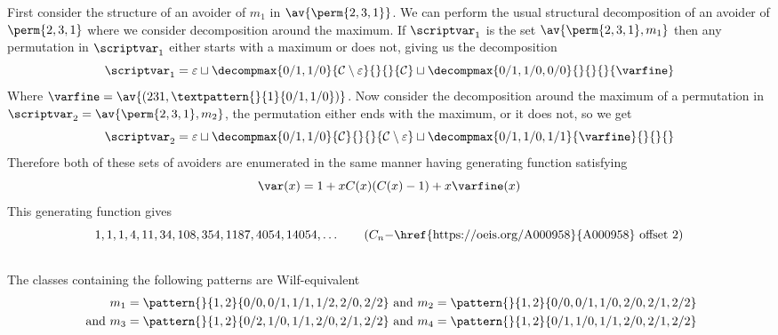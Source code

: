 First consider the structure of an avoider of \(m_1\) in \(\av{\perm{2,3,1}}\).
We can perform the usual structural decomposition of an avoider
of \(\perm{2,3,1}\) where we consider decomposition around the maximum.
If \(\scriptvar_1\) is the set \(\av{\perm{2,3,1},m_1}\) then any permutation in
\(\scriptvar_1\) either starts with a maximum or does not, giving us the
decomposition
\begin{equation*}
    \scriptvar_1 = \varepsilon \sqcup
    \decompmax{0/1,1/0}{\mathcal{C}\setminus\varepsilon}{}{}{\mathcal{C}} \sqcup
    \decompmax{0/1,1/0,0/0}{}{}{}{\mathcal{\varfine}}
\end{equation*}
Where \(\mathcal{\varfine} = \av{(231,\textpattern{}{1}{0/1,1/0})}\).
Now consider the decomposition around the maximum of a permutation in
\(\scriptvar_2 = \av{\perm{2,3,1},m_2}\), the permutation either ends with
the maximum, or it does not, so we get
\begin{equation*}
    \scriptvar_2 = \varepsilon \sqcup
    \decompmax{0/1,1/0}{\mathcal{C}}{}{}{\mathcal{C}\setminus\varepsilon} \sqcup
    \decompmax{0/1,1/0,1/1}{\mathcal{\varfine}}{}{}{}
\end{equation*}
Therefore both of these sets of avoiders are enumerated in the same manner
having generating function satisfying
\begin{equation*}
    \var(x) = 1 + xC(x)(C(x)-1) + x\varfine(x)
\end{equation*}
This generating function gives
\begin{equation*}
    1, 1, 1, 4, 11, 34, 108, 354, 1187, 4054, 14054,\dotsc \tag{\(C_n - \)\href{https://oeis.org/A000958}{A000958} offset 2}
\end{equation*}


\subsection{}
\nextvar
The classes containing the following patterns are Wilf-equivalent
\begin{equation*}
    \begin{aligned}
        m_1 = \pattern{}{1,2}{0/0,0/1,1/1,1/2,2/0,2/2} &\text{ and }
        m_2 = \pattern{}{1,2}{0/0,0/1,1/0,2/0,2/1,2/2} \\
        \text{ and }
        m_3 = \pattern{}{1,2}{0/2,1/0,1/1,2/0,2/1,2/2} &\text{ and }
        m_4 = \pattern{}{1,2}{0/1,1/0,1/1,2/0,2/1,2/2}
    \end{aligned}
\end{equation*}

